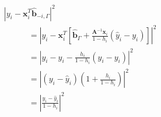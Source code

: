 \documentclass[10pt]{article}
\begin{document}
\begin{align*}\begin{split}
&\left| y_i - \boldsymbol x_i^T \boldsymbol{\hat{b}}_{-i,\Gamma} \right|^2 \\
&\phantom{100000} = 
\left| y_i - \boldsymbol x_i^T \left[
\boldsymbol{\hat{b}}_\Gamma + 
\frac{\boldsymbol A^{-1} \boldsymbol x_i}{1 - h_i} 
\left(\hat{y}_i - y_i\right)
\right] \right|^2 \\
&\phantom{100000} = 
\left|y_i - \hat{y}_i - 
\frac{h_i}{1 - h_i} 
\left(\hat{y}_i - y_i \right)
\right|^2 \\
&\phantom{100000} =
\left| \left( y_i - \hat{y}_i \right)
\left(1 + \frac{h_i}{1 - h_i}\right)
\right|^2 \\
&\phantom{100000} =
\left| \frac{y_i - \hat{y}_i}{1 - h_i} \right|^2
\end{split}\end{align*}
\end{document}

